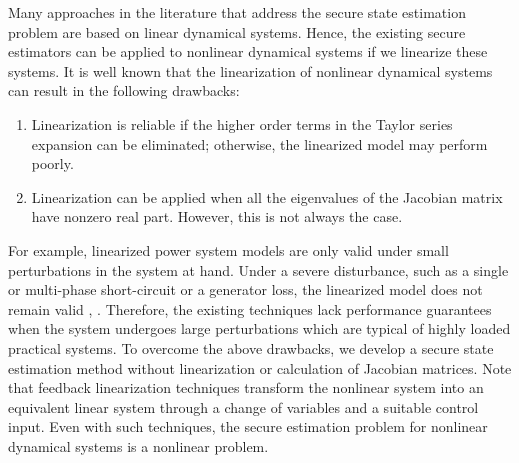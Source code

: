 \documentclass[../../thesis.tex]{subfiles}
\begin{document}
%



Many approaches in the literature that address the secure state estimation problem are based on linear dynamical systems. Hence, the existing secure estimators can be applied to nonlinear dynamical systems if we linearize these systems. It is well known that the linearization of nonlinear dynamical systems can result in the following drawbacks:
\begin{enumerate}
\item Linearization is reliable if the higher order terms in the Taylor series expansion can be eliminated; otherwise, the linearized model may perform poorly. %
\item Linearization can be applied when all the eigenvalues of the Jacobian matrix have nonzero real part. However, this is not always the case.
\end{enumerate}
For example, linearized power system models are only valid under small perturbations in the system at hand. Under a severe disturbance, such as a single or multi-phase short-circuit or a generator loss, the linearized model does not remain valid \cite{Kundur}, \cite{nonlin_est}. Therefore, the existing techniques lack performance guarantees when the system undergoes large perturbations which are typical of highly loaded practical systems. To overcome the above drawbacks, we develop a secure state estimation method without linearization or calculation of Jacobian matrices. Note that feedback linearization techniques transform the nonlinear system into an equivalent linear system through a change of variables and a suitable control input. Even with such techniques, the secure estimation problem for nonlinear dynamical systems is a nonlinear problem.
\end{document}
